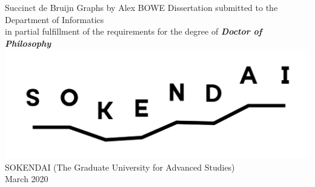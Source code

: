 \documentclass[11pt,a4paper]{report}
\numberwithin{lemma}{chapter}
\numberwithin{theorem}{chapter}
\begin{document}

\newcommand\circrow{\leavevmode\xleaders\hbox{\scalebox{2}{$\mkern.5mu\bigcirc\mkern.5mu$}}\hfill\kern0pt}
\begin{center}
\fontsize{20}{19.2}\selectfont  
Succinct de Bruijn Graphs
\vskip8mm
\fontsize{16}{19.2}\selectfont  
by
\vskip4.5mm
Alex BOWE
\vskip1.7cm
Dissertation
\vskip8mm
{\Large
submitted to the Department of Informatics\\[-6pt]
in partial fulfillment of the requirements for the degree of}
\vskip1.5cm
\emph{\bfseries Doctor of Philosophy}
\vskip9mm
\includegraphics[width=.87\textwidth]{sokendai}
\vskip1.1cm
{\Large SOKENDAI (The Graduate University for Advanced Studies)\\[-5pt]
March 2020}
\end{center}  
\restoregeometry
\clearpage


\end{document}
